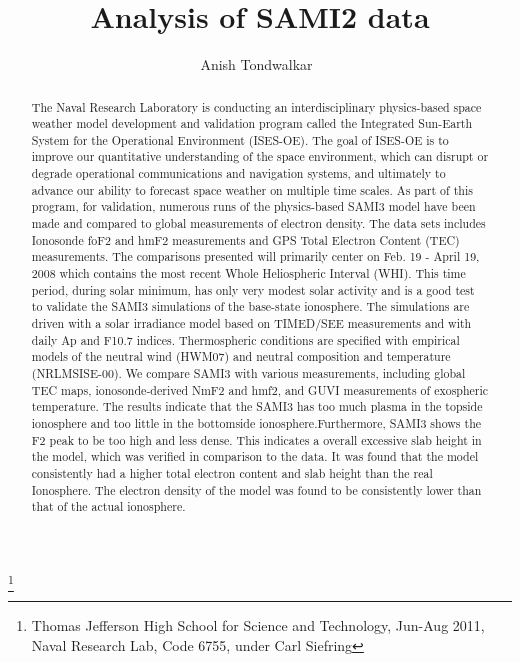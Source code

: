\documentclass[journal,twoside]{IEEEtran}
\begin{document}
\title{Analysis of SAMI2 data}
\author{Anish Tondwalkar~}
\thanks{Thomas Jefferson High School for Science and Technology,
Jun-Aug 2011, Naval Research Lab, Code 6755, under Carl Siefring}%
\maketitle


\begin{abstract}
The Naval Research Laboratory is conducting an interdisciplinary physics-based space weather model development and validation program called the Integrated Sun-Earth System for the Operational Environment (ISES-OE). The goal of ISES-OE is to improve our quantitative understanding of the space environment, which can disrupt or degrade operational communications and navigation systems, and ultimately to advance our ability to forecast space weather on multiple time scales. As part of this program, for validation, numerous runs of the physics-based SAMI3 model have been made and compared to global measurements of electron density.  The data sets includes  Ionosonde foF2 and hmF2 measurements and GPS Total Electron Content (TEC) measurements. The comparisons presented will primarily center on Feb. 19 - April 19, 2008 which contains the most recent Whole Heliospheric Interval (WHI).  This time period, during solar minimum, has only very modest solar activity and is a good test to validate the SAMI3 simulations of the base-state ionosphere. The simulations are driven with a solar irradiance model based on TIMED/SEE measurements and with daily Ap and F10.7 indices. Thermospheric conditions are specified with empirical models of the neutral wind (HWM07) and neutral composition and temperature (NRLMSISE-00). We compare SAMI3 with various measurements, including global TEC maps, ionosonde-derived NmF2 and hmf2, and GUVI measurements of exospheric temperature.  The results indicate that the SAMI3 has too much plasma in the topside ionosphere and too little in the bottomside ionosphere.Furthermore, SAMI3 shows the F2 peak to be too high and less dense. This indicates a overall excessive slab height in the model, which was verified in comparison to the data.
It was found that the model consistently had a higher 
total electron content and slab height than the real Ionosphere. The electron
density of the model was found to be consistently lower than that of the 
actual ionosphere.
\end{abstract}
\end{document}
